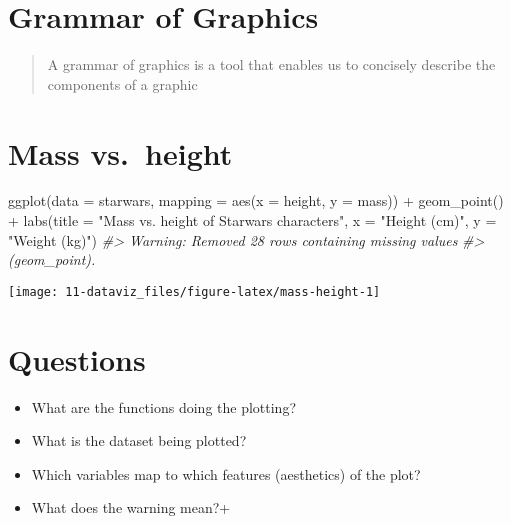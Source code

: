 \documentclass[
]{book}
\newenvironment{Shaded}{\begin{snugshade}}{\end{snugshade}}
\newcommand{\AttributeTok}[1]{\textcolor[rgb]{0.77,0.63,0.00}{#1}}
\newcommand{\CommentTok}[1]{\textcolor[rgb]{0.56,0.35,0.01}{\textit{#1}}}
\newcommand{\FunctionTok}[1]{\textcolor[rgb]{0.00,0.00,0.00}{#1}}
\newcommand{\NormalTok}[1]{#1}
\newcommand{\SpecialCharTok}[1]{\textcolor[rgb]{0.00,0.00,0.00}{#1}}
\newcommand{\StringTok}[1]{\textcolor[rgb]{0.31,0.60,0.02}{#1}}
\providecommand{\tightlist}{%
  \setlength{\itemsep}{0pt}\setlength{\parskip}{0pt}}
\theoremstyle{definition}
\theoremstyle{definition}
\theoremstyle{definition}
\theoremstyle{definition}
\theoremstyle{remark}
\begin{document}
\hypertarget{grammar-of-graphics-1}{%
\section{Grammar of Graphics}\label{grammar-of-graphics-1}}

\begin{quote}
A grammar of graphics is a tool that enables us to concisely describe the components of a graphic
\end{quote}

\hypertarget{mass-vs.-height-3}{%
\section{Mass vs.~height}\label{mass-vs.-height-3}}

\begin{Shaded}
\begin{Highlighting}[]
\FunctionTok{ggplot}\NormalTok{(}\AttributeTok{data =}\NormalTok{ starwars, }\AttributeTok{mapping =} \FunctionTok{aes}\NormalTok{(}\AttributeTok{x =}\NormalTok{ height, }\AttributeTok{y =}\NormalTok{ mass)) }\SpecialCharTok{+}
  \FunctionTok{geom\_point}\NormalTok{() }\SpecialCharTok{+}
  \FunctionTok{labs}\NormalTok{(}\AttributeTok{title =} \StringTok{"Mass vs. height of Starwars characters"}\NormalTok{,}
       \AttributeTok{x =} \StringTok{"Height (cm)"}\NormalTok{, }\AttributeTok{y =} \StringTok{"Weight (kg)"}\NormalTok{)}
\CommentTok{\#\textgreater{} Warning: Removed 28 rows containing missing values}
\CommentTok{\#\textgreater{} (geom\_point).}
\end{Highlighting}
\end{Shaded}

\begin{center}\texttt{[image: 11-dataviz\_files/figure-latex/mass-height-1]} \end{center}

\hypertarget{questions-5}{%
\section{Questions}\label{questions-5}}

\begin{itemize}
\tightlist
\item
  What are the functions doing the plotting?
\item
  What is the dataset being plotted?
\item
  Which variables map to which features (aesthetics) of the plot?
\item
  What does the warning mean?+
\end{itemize}
\end{document}
